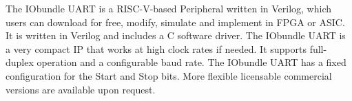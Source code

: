 %

The IObundle UART is a RISC-V-based Peripheral written in Verilog, which users
can download for free, modify, simulate and implement in FPGA or ASIC. It is
written in Verilog and includes a C software driver. The IObundle UART is a very
compact IP that works at high clock rates if needed. It supports full-duplex
operation and a configurable baud rate. The IObundle UART has a fixed
configuration for the Start and Stop bits. More flexible licensable commercial
versions are available upon request.



